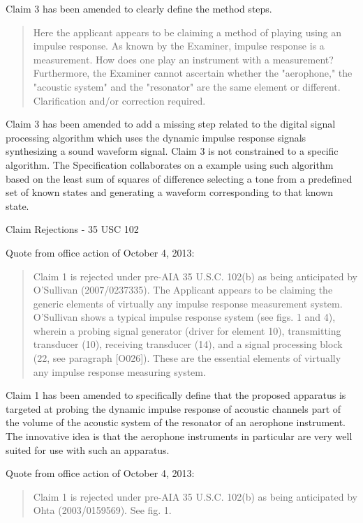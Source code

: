 Claim 3 has been amended to clearly define the method steps.

\begin{quote}
Here the applicant appears to be claiming a method of
playing using an impulse response. As known by the Examiner, impulse response is a
measurement. How does one play an instrument with a measurement? Furthermore,
the Examiner cannot ascertain whether the "aerophone," the "acoustic system" and the
"resonator" are the same element or different. Clarification and/or correction required.
\end{quote}

Claim 3 has been amended to add a missing step related to the digital signal processing algorithm which uses the dynamic impulse response signals synthesizing a sound waveform signal. Claim 3 is not constrained to a specific algorithm. The Specification collaborates on a example using such algorithm based on the least sum of squares of difference selecting a tone from a predefined set of known states and generating a waveform corresponding to that known state.

Claim Rejections - 35 USC  102

Quote from office action of October 4, 2013:

\begin{quote}
Claim 1 is rejected under pre-AIA 35 U.S.C. 102(b) as being anticipated by
O'Sullivan (2007/0237335). The Applicant appears to be claiming the generic elements
of virtually any impulse response measurement system. O'Sullivan shows a typical
impulse response system (see figs. 1 and 4), wherein a probing signal generator (driver
for element 10), transmitting transducer (10), receiving transducer (14), and a signal
processing block (22, see paragraph [O026]). These are the essential elements of
virtually any impulse response measuring system.
\end{quote}

Claim 1 has been amended to specifically define that the proposed apparatus is targeted at probing the dynamic impulse response of acoustic channels part of the volume of the acoustic system of the resonator of an aerophone instrument. The innovative idea is that the aerophone instruments in particular are very well suited for use with such an apparatus.

Quote from office action of October 4, 2013:

\begin{quote}
Claim 1 is rejected under pre-AIA 35 U.S.C. 102(b) as being anticipated by Ohta
(2003/0159569). See fig. 1.
\end{quote}

